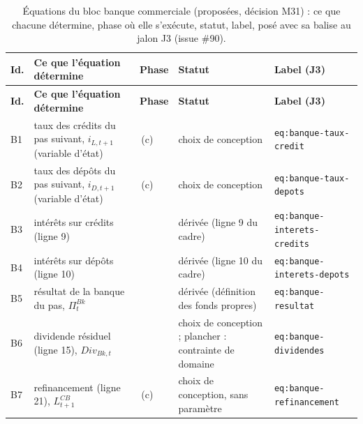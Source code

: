\documentclass[11pt,a4paper]{article}
\begin{document}
\begin{center}\footnotesize
\setlength{\tabcolsep}{4pt}
\begin{longtable}{>{\raggedright\arraybackslash}p{0.8cm}>{\raggedright\arraybackslash}p{4.6cm}>{\raggedright\arraybackslash}p{1.9cm}>{\raggedright\arraybackslash}p{3.0cm}>{\raggedright\arraybackslash}p{4.4cm}}
\caption{Équations du bloc banque commerciale (proposées, décision M31) : ce que chacune détermine, phase où elle s'exécute, statut, label, posé avec sa balise au jalon J3 (issue \#90).}\label{tab:banque-equations}\\
\toprule
\textbf{Id.} & \textbf{Ce que l'équation détermine} & \textbf{Phase} & \textbf{Statut} & \textbf{Label (J3)}\\
\midrule
\endfirsthead
\toprule
\textbf{Id.} & \textbf{Ce que l'équation détermine} & \textbf{Phase} & \textbf{Statut} & \textbf{Label (J3)}\\
\midrule
\endhead
B1 & taux des crédits du pas suivant, $i_{L,t+1}$ (variable d'état) & 8\,(c) & choix de conception & \texttt{eq:banque-\allowbreak taux-credit}\\
B2 & taux des dépôts du pas suivant, $i_{D,t+1}$ (variable d'état) & 8\,(c) & choix de conception & \texttt{eq:banque-\allowbreak taux-depots}\\
B3 & intérêts sur crédits (ligne 9) & 6 & dérivée (ligne 9 du cadre) & \texttt{eq:banque-\allowbreak interets-credits}\\
B4 & intérêts sur dépôts (ligne 10) & 6 & dérivée (ligne 10 du cadre) & \texttt{eq:banque-\allowbreak interets-depots}\\
B5 & résultat de la banque du pas, $\Pi^{\mathit{Bk}}_t$ & 6 & dérivée (définition des fonds propres) & \texttt{eq:banque-\allowbreak resultat}\\
B6 & dividende résiduel (ligne 15), $\mathit{Div}_{\mathit{Bk},t}$ & 6 & choix de conception ; plancher : contrainte de domaine & \texttt{eq:banque-\allowbreak dividendes}\\
B7 & refinancement (ligne 21), $L^{\mathit{CB}}_{t+1}$ & 8\,(c) & choix de conception, sans paramètre & \texttt{eq:banque-\allowbreak refinancement}\\
\bottomrule
\end{longtable}
\end{center}
\end{document}
